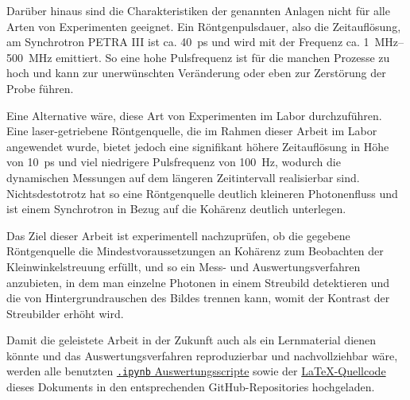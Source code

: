 \noindent
Darüber hinaus sind die Charakteristiken der genannten Anlagen nicht für alle Arten von Experimenten geeignet. Ein Röntgenpulsdauer, also die Zeitauflösung, am Synchrotron PETRA III ist ca. \SI{40}{\pico\second} und wird mit der Frequenz ca. \SIrange[range-units = single]{1}{500}{\mega\hertz} emittiert. So eine hohe Pulsfrequenz ist für die manchen Prozesse zu hoch und kann zur unerwünschten Veränderung oder eben zur Zerstörung der Probe führen.

\noindent
Eine Alternative wäre, diese Art von Experimenten im Labor durchzuführen. Eine laser-getriebene Röntgenquelle, die im Rahmen dieser Arbeit im Labor angewendet wurde, bietet jedoch eine signifikant höhere Zeitauflösung in Höhe von \SI{10}{\pico\second} und viel niedrigere Pulsfrequenz von \SI{100}{\hertz}, wodurch die dynamischen Messungen auf dem längeren Zeitintervall realisierbar sind. Nichtsdestotrotz hat so eine Röntgenquelle deutlich kleineren Photonenfluss und ist einem Synchrotron in Bezug auf die Kohärenz deutlich unterlegen.  

\noindent
Das Ziel dieser Arbeit ist experimentell nachzuprüfen, ob die gegebene Röntgenquelle die Mindestvoraussetzungen an Kohärenz zum Beobachten der Kleinwinkelstreuung erfüllt, und so ein Mess- und Auswertungsverfahren anzubieten, in dem man einzelne Photonen in einem Streubild detektieren und die von Hintergrundrauschen des Bildes trennen kann, womit der Kontrast der Streubilder erhöht wird.

\noindent
Damit die geleistete Arbeit in der Zukunft auch als ein Lernmaterial dienen könnte und das Auswertungsverfahren reproduzierbar und nachvollziehbar wäre, werden alle benutzten \href{https://github.com/lrlunin/bachelorarbeit_python_notebooks_and_data/}{\color{blue}\texttt{.ipynb} Auswertungsscripte} sowie der \href{https://github.com/lrlunin/Bachelorarbeit/}{\color{blue}\LaTeX-Quellcode} dieses Dokuments in den entsprechenden GitHub-Repositories hochgeladen.   


